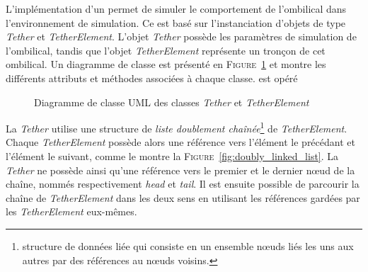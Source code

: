 				L'implémentation d'un \plugin{} \gazebo{} permet de simuler le comportement de l'ombilical dans l'environnement de simulation. Ce \plugin{} est basé sur l'instanciation d'objets de type \textit{Tether} et \textit{TetherElement}. L'objet \textit{Tether} possède les paramètres de simulation de l'ombilical, tandis que l'objet \textit{TetherElement} représente un tronçon de cet ombilical. Un diagramme de classe est présenté en \textsc{Figure}~\ref{fig:uml_class} et montre les différents attributs et méthodes associées à chaque classe.
				est opéré
				\begin{figure}[!htb]
					\centering
					\caption{Diagramme de classe UML des classes \textit{Tether} et \textit{TetherElement}}
					\label{fig:uml_class}
				\end{figure}
				
				La \textit{Tether} utilise une structure de \textit{liste doublement chaînée}\footnote{structure de données liée qui consiste en un ensemble n\oe uds liés les uns aux autres par des références au n\oe uds voisins.} de \textit{TetherElement}. Chaque \textit{TetherElement} possède alors une référence vers l'élément le précédant et l'élément le suivant, comme le montre la \textsc{Figure}~\ref{fig:doubly_linked_list}. La \textit{Tether} ne possède ainsi qu'une référence vers le premier et le dernier n\oe ud de la chaîne, nommés respectivement \textit{head} et \textit{tail}. Il est ensuite possible de parcourir la chaîne de \textit{TetherElement} dans les deux sens en utilisant les références gardées par les \textit{TetherElement} eux-mêmes. 
			
